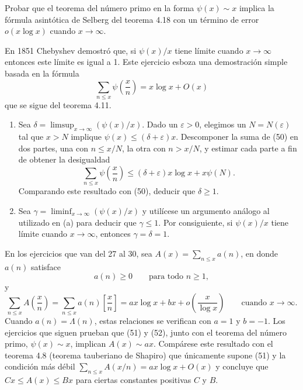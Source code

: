 \documentclass[12pt,a4paper]{book}
\begin{document}
    \begin{ejercicio}
        Probar que el teorema del número primo en la forma $\psi(x)\sim x$ implica la
        fórmula asintótica de Selberg del teorema 4.18 con un término de error
        $o(x\log x)$ cuando $x\to\infty$.
    \end{ejercicio}

    \begin{ejercicio}
        En 1851 Chebyshev demostró que, si $\psi(x)/x$ tiene límite cuando
        $x\to\infty$ entonces este límite es igual a 1. Este ejercicio esboza una
        demostración simple basada en la fórmula
        \begin{equation}
            \sum_{n\leq x}\psi\left(\frac{x}{n}\right)=x\log x+O(x)
        \end{equation}
        que se sigue del teorema 4.11.
        \begin{enumerate}
            \item[(a)] Sea $\delta=\limsup_{x\to\infty}(\psi(x)/x)$. Dado un
            $\varepsilon>0$, elegimos un $N=N(\varepsilon)$ tal que $x>N$ implique
            $\psi(x)\leq(\delta+\varepsilon)x$. Descomponer la suma de (50) en dos
            partes, una con $n\leq x/N$, la otra con $n>x/N$, y estimar cada parte a
            fin de obtener la desigualdad
            \begin{equation*}
                \sum_{n\leq x}\psi\left(\frac{x}{n}\right)\leq(\delta+\varepsilon)x\log x+x\psi(N).
            \end{equation*}
            Comparando este resultado con (50), deducir que $\delta\geq1$.
            \item[(b)] Sea $\gamma=\liminf_{x\to\infty}(\psi(x)/x)$ y utilícese un
            argumento análogo al utilizado en (a) para deducir que $\gamma\leq1$. Por
            consiguiente, si $\psi(x)/x$ tiene límite cuando $x\to\infty$, entonces
            $\gamma=\delta=1$.
        \end{enumerate}
    \end{ejercicio}

    En los ejercicios que van del 27 al 30, sea $A(x)=\sum_{n\leq x}a(n)$, en donde
    $a(n)$ satisface
    \begin{equation}
        a(n)\geq0\qquad\text{para todo } n\geq1,
    \end{equation}
    y
    \begin{equation}
        \sum_{n\leq x}A\left(\frac{x}{n}\right)=\sum_{n\leq x}a(n)\left[\frac{x}{n}\right]
        =ax\log x+bx+o\left(\frac{x}{\log x}\right)\qquad\text{cuando } x\to\infty.
    \end{equation}
    Cuando $a(n)=\Lambda(n)$, estas relaciones se verifican con $a=1$ y $b=-1$. Los
    ejercicios que siguen prueban que (51) y (52), junto con el teorema del número
    primo, $\psi(x)\sim x$, implican $A(x)\sim ax$. Compárese este resultado con el
    teorema 4.8 (teorema tauberiano de Shapiro) que únicamente supone (51) y la
    condición más débil $\sum_{n\leq x}A(x/n)=ax\log x+O(x)$ y concluye que
    $Cx\leq A(x)\leq Bx$ para ciertas constantes positivas $C$ y $B$.
\end{document}

